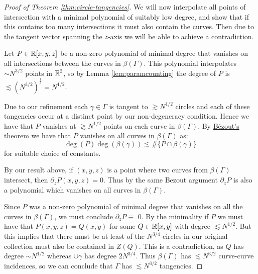 \begin{proof}[Proof of Theorem \ref{thm:circle-tangencies}]
    We will now interpolate all points of intersection with a minimal polynomial of suitably low degree, and show that if this contains too many intersections it must also contain the curves. 
    Then due to the tangent vector spanning the $z$-axis we will be able to achieve a contradiction.

    Let $P \in \mathbb R[x,y,z]$ be a non-zero polynomial of minimal degree that vanishes on all intersections between the curves in $\beta (\Gamma)$. 
    This polynomial interpolates $\sim N^{3/2}$ points in $\mathbb R^3$, so by Lemma \ref{lem:paramcounting}
    the degree of $P$ is $\lesssim \left(N^{3/2}\right)^{\frac{1}{3}} =  N^{1/2}$. 

    Due to our refinement each $\gamma \in \Gamma$ is 
    tangent to $\gtrsim N^{1/2}$ circles and each of these tangencies occur at a distinct point by our non-degeneracy condition.   
    Hence we have that $P$ vanishes at $\gtrsim N^{1/2}$ points on each curve in $\beta (\Gamma)$.
    By \hyperref[lem:Bezout]{Bézout's theorem} we have that $P$ vanishes on all curves in $\beta(\Gamma)$ as:
    \[
    \deg (P) \deg (\beta(\gamma))  \lesssim \# \{ P \cap \beta(\gamma)\}  
    \]
    for suitable choice of constants. 

    By our result above, if $(x,y,z)$ is a point where two curves from $\beta (\Gamma)$ intersect, then $\partial_z P (x,y,z)  =0 $. 
    Thus by the same Bezout argument $\partial_z P$ is also a polynomial which vanishes on all curves in $\beta(\Gamma)$. 

    Since $P$ was a non-zero polynomial of minimal degree that vanishes on all the curves in $\beta (\Gamma)$, we must conclude 
    $\partial_z P \equiv$ 0. By the minimality if $P$ we must have that $P(x,y,z) = Q(x,y)$ for some $Q \in \mathbb R[x,y]$ with degree $\lesssim N^{1/2}$. 
    But this implies that there must be at least of the $N^{3/4}$ circles in our original collection must also be contained in $Z(Q)$.
    This is a contradiction, as $Q$ has degree $\sim N^{1/2}$ whereas $\cup \gamma$ has degree $2N^{3/4}$.
    Thus $\beta(\Gamma)$ has $\lesssim N^{3/2}$ curve-curve incidences, so we can conclude that $\Gamma$ has $\lesssim N^{3/2}$ tangencies.
\end{proof}

